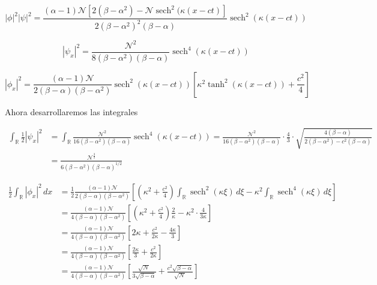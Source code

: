 \documentclass[letterpaper,11pt]{exam}
\newcommand{\sech}{\operatorname{sech}}
\theoremstyle{plain}
\begin{document}
\begin{equation*}
    |\phi|^2|\psi|^2=\frac{(\alpha-1)\mathcal{N}[2(\beta-\alpha^2)-\mathcal{N}\sech^2(\kappa(x-ct)]}{2(\beta-\alpha^2)^2(\beta-\alpha)}\sech^2(\kappa(x-ct))
\end{equation*}

\begin{equation*}
    |\psi_x|^2=\frac{\mathcal{N}^2}{8(\beta-\alpha^2)(\beta-\alpha)}\sech^4(\kappa (x-ct))
\end{equation*}

\begin{equation*}
    |\phi_x|^2=\frac{(\alpha-1)\mathcal{N}}{2(\beta-\alpha)(\beta-\alpha^2)}\sech^2(\kappa(x-ct))\left[\kappa^2\tanh^2(\kappa(x-ct))+\frac{c^2}4{}\right] 
\end{equation*}

Ahora desarrollaremos las integrales

\begin{align*}
    \int_{\mathbb{R}} \frac{1}{2}|\psi_x|^2&= \int_{\mathbb{R}}  \frac{\mathcal{N}^2}{16(\beta-\alpha^2)(\beta-\alpha)}\sech^4(\kappa (x-ct)) =\frac{\mathcal{N}^2}{16(\beta-\alpha^2)(\beta-\alpha)}\cdot\frac{4}{3}\cdot \sqrt{\frac{4(\beta-\alpha)}{2(\beta-\alpha^2)-c^2(\beta-\alpha)}} \\
    &=\frac{\mathcal{N}^\frac{3}{2}}{6(\beta-\alpha^2)(\beta-\alpha)^{1/2}}
\end{align*}

\begin{align*}
\frac{1}{2}\int_{\mathbb{R}}|\phi_x|^2\,dx &= \frac{1}{2}\frac{(\alpha-1)\mathcal{N}}{2(\beta-\alpha)(\beta-\alpha^2)}\left[\left(\kappa^2+\frac{c^2}{4}\right)\int_{\mathbb{R}}\operatorname{sech}^2(\kappa\xi)\,d\xi - \kappa^2\int_{\mathbb{R}}\operatorname{sech}^4(\kappa\xi)\,d\xi\right]\\[8pt]
&= \frac{(\alpha-1)\mathcal{N}}{4(\beta-\alpha)(\beta-\alpha^2)}\left[\left(\kappa^2+\frac{c^2}{4}\right)\frac{2}{\kappa} - \kappa^2\cdot\frac{4}{3\kappa}\right]\\[8pt]
&= \frac{(\alpha-1)\mathcal{N}}{4(\beta-\alpha)(\beta-\alpha^2)}\left[2\kappa+\frac{c^2}{2\kappa}-\frac{4\kappa}{3}\right]\\[8pt]
&= \frac{(\alpha-1)\mathcal{N}}{4(\beta-\alpha)(\beta-\alpha^2)}\left[\frac{2\kappa}{3}+\frac{c^2}{2\kappa}\right]\\[8pt]
&= \frac{(\alpha-1)\mathcal{N}}{4(\beta-\alpha)(\beta-\alpha^2)}\left[\frac{\sqrt{\mathcal{N}}}{3\sqrt{\beta-\alpha}}+\frac{c^2\sqrt{\beta-\alpha}}{\sqrt{\mathcal{N}}}\right]
\end{align*}
\end{document}
